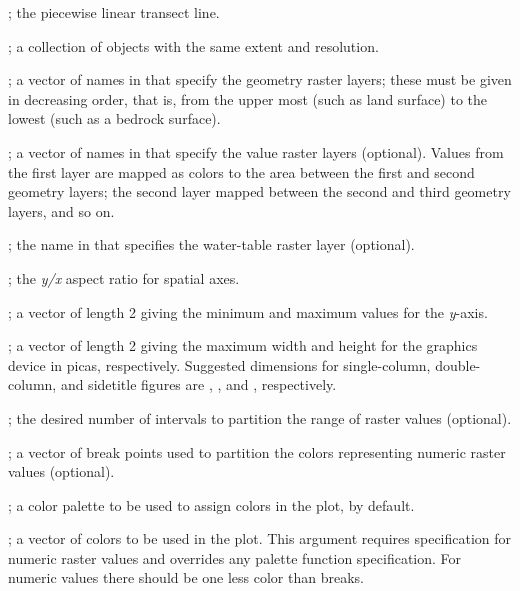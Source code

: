 \documentclass[letterpaper]{book}
\begin{document}
%
\begin{Arguments}
\begin{ldescription}
\item[\code{transect}] ; the piecewise linear transect line.
\item[\code{rs}] ; a collection of  objects with the same extent and resolution.
\item[\code{geo.lays}] ; a vector of names in  that specify the geometry raster layers; these must be given in decreasing order, that is, from the upper most (such as land surface) to the lowest (such as a bedrock surface).
\item[\code{val.lays}] ; a vector of names in  that specify the value raster layers (optional).
Values from the first layer are mapped as colors to the area between the first and second geometry layers; the second layer mapped between the second and third geometry layers, and so on.
\item[\code{wt.lay}] ; the name in  that specifies the water-table raster layer (optional).
\item[\code{asp}] ; the \emph{y/x} aspect ratio for spatial axes.
\item[\code{ylim}] ; a vector of length 2 giving the minimum and maximum values for the \emph{y}-axis.
\item[\code{max.dev.dim}] ; a vector of length 2 giving the maximum width and height for the graphics device in picas, respectively.
Suggested dimensions for single-column, double-column, and sidetitle figures are , , and , respectively.
\item[\code{n}] ; the desired number of intervals to partition the range of raster values (optional).
\item[\code{breaks}] ; a vector of break points used to partition the colors representing numeric raster values (optional).
\item[\code{pal}] ; a color palette to be used to assign colors in the plot,  by default.
\item[\code{col}] ; a vector of colors to be used in the plot.
This argument requires  specification for numeric raster values and overrides any palette function specification.
For numeric values there should be one less color than breaks.

\end{ldescription}
\end{Arguments}
\end{document}
